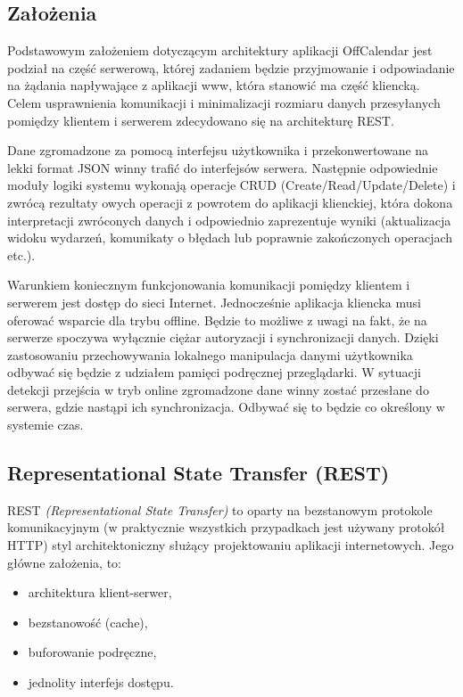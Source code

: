 \subsection{Założenia}
\label{sec:zalozenia}

Podstawowym założeniem dotyczącym architektury aplikacji OffCalendar jest podział na część serwerową, której zadaniem będzie przyjmowanie i odpowiadanie na żądania napływające z aplikacji www, która stanowić ma część kliencką. Celem usprawnienia komunikacji i minimalizacji rozmiaru danych przesyłanych pomiędzy klientem i serwerem zdecydowano się na architekturę REST.

Dane zgromadzone za pomocą interfejsu użytkownika i przekonwertowane na lekki format JSON winny trafić do interfejsów serwera. Następnie odpowiednie moduły logiki systemu wykonają operacje CRUD (Create/Read/Update/Delete) i zwrócą rezultaty owych operacji z powrotem do aplikacji klienckiej, która dokona interpretacji zwróconych danych i odpowiednio zaprezentuje wyniki (aktualizacja widoku wydarzeń, komunikaty o błędach lub poprawnie zakończonych operacjach etc.).

Warunkiem koniecznym funkcjonowania komunikacji pomiędzy klientem i serwerem jest dostęp do sieci Internet. Jednocześnie aplikacja kliencka musi oferować wsparcie dla trybu offline. Będzie to możliwe z uwagi na fakt, że na serwerze spoczywa wyłącznie ciężar autoryzacji i synchronizacji danych. Dzięki zastosowaniu przechowywania lokalnego manipulacja danymi użytkownika odbywać się będzie z udziałem pamięci podręcznej przeglądarki. W sytuacji detekcji przejścia w tryb online zgromadzone dane winny zostać przesłane do serwera, gdzie nastąpi ich synchronizacja. Odbywać się to będzie co określony w systemie czas.

\subsection{Representational State Transfer (REST)}
\label{sec:REST}

REST \emph{(Representational State Transfer)}\cite{restTut} to oparty na bezstanowym protokole komunikacyjnym (w praktycznie wszystkich przypadkach jest używany protokół HTTP) styl architektoniczny służący projektowaniu aplikacji internetowych. Jego główne założenia, to:

\begin{itemize}
\item architektura klient-serwer,
\item bezstanowość (cache),
\item buforowanie podręczne,
\item jednolity interfejs dostępu.
\end{itemize}

